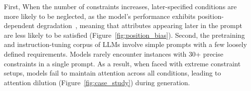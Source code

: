 First, When the number of constraints increases, later-specified conditions are more likely to be neglected, as the model’s performance exhibits position-dependent degradation~\citep{lost-in-the-middle}, meaning that attributes appearing later in the prompt are less likely to be satisfied (Figure~\ref{fig:position_bias}). Second, the pretraining and instruction-tuning corpus of LLMs involve simple prompts with a few loosely defined requirements. Models rarely encounter instances with 30+ precise constraints in a single prompt. As a result, when faced with extreme constraint setups, models fail to maintain attention across all conditions, leading to attention dilution (Figure~\ref{fig:case_study}) during generation.






